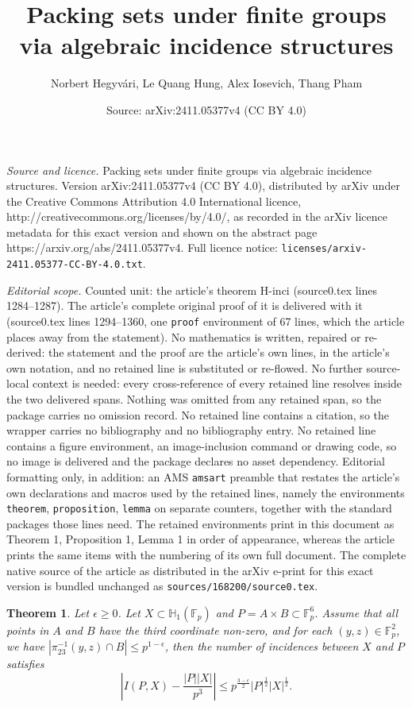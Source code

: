 \documentclass[10pt,a4paper]{amsart}
\title{Packing sets under finite groups via algebraic incidence structures}
\author{Norbert Hegyv\'ari, Le Quang Hung, Alex Iosevich, Thang Pham}
\date{Source: arXiv:2411.05377v4 (CC BY 4.0)}
\newtheorem{theorem}{Theorem}
\def\Fbb{\mathbb{F}}
\begin{document}
\maketitle

\noindent\emph{Source and licence.} Packing sets under finite groups via algebraic incidence structures. Version arXiv:2411.05377v4 (CC BY 4.0), distributed by arXiv under the Creative Commons Attribution 4.0 International licence, http://creativecommons.org/licenses/by/4.0/, as recorded in the arXiv licence metadata for this exact version and shown on the abstract page https://arxiv.org/abs/2411.05377v4. Full licence notice: \texttt{licenses/arxiv-2411.05377-CC-BY-4.0.txt}.\par\smallskip

\noindent\textit{Editorial scope.} Counted unit: the article's theorem H-inci (source0.tex lines 1284--1287). The article's complete original proof of it is delivered with it (source0.tex lines 1294--1360, one \texttt{proof} environment of 67 lines, which the article places away from the statement). No mathematics is written, repaired or re-derived: the statement and the proof are the article's own lines, in the article's own notation, and no retained line is substituted or re-flowed.  No further source-local context is needed: every cross-reference of every retained line resolves inside the two delivered spans.  Nothing was omitted from any retained span, so the package carries no omission record.  No retained line contains a citation, so the wrapper carries no bibliography and no bibliography entry.  No retained line contains a figure environment, an image-inclusion command or drawing code, so no image is delivered and the package declares no asset dependency.  Editorial formatting only, in addition: an AMS \texttt{amsart} preamble that restates the article's own declarations and macros used by the retained lines, namely the environments \texttt{theorem}, \texttt{proposition}, \texttt{lemma} on separate counters, together with the standard packages those lines need.  The retained environments print in this document as Theorem 1, Proposition 1, Lemma 1 in order of appearance, whereas the article prints the same items with the numbering of its own full document.  The complete native source of the article as distributed in the arXiv e-print for this exact version is bundled unchanged as \texttt{sources/168200/source0.tex}.
\begin{theorem}\label{H-inci}Let $\epsilon\ge 0$.
    Let $X\subset \mathbb{H}_1(\Fbb_p)$ and $P=A\times B\subset \mathbb{F}_p^6$. Assume that all points in $A$ and $B$ have the third coordinate non-zero, and for each $(y, z)\in \mathbb{F}_p^2$, we have $|\pi_{23}^{-1}(y, z)\cap B|\le p^{1-\epsilon}$, then the number of incidences between $X$ and $P$ satisfies
    \[\left\vert I(P, X)- \frac{|P||X|}{p^3} \right\vert\le p^{\frac{3-\epsilon}{2}}|P|^{\frac{1}{2}}|X|^{\frac{1}{2}}.\]
\end{theorem}
\end{document}
